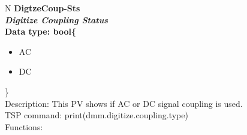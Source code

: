 \documentclass[openany]{article}
\begin{document}
		\begin{tabular}{N}
			\hline
			\bfseries DigtzeCoup-Sts\label{pv:digtzecoup-sts} \\ \hline
			\emph{Digitize Coupling Status} \\
			Data type: bool\{\begin{itemize}[noitemsep]
				\small
				\item[] AC
				\item[] DC
			\end{itemize}\} \\
			Description: This PV shows if AC or DC signal coupling is used. \\
			TSP command: print(dmm.digitize.coupling.type) \\
			Functions: \\
			\arrayrulecolor{\FuncTableBorderColor}

		\end{tabular}
\end{document}
